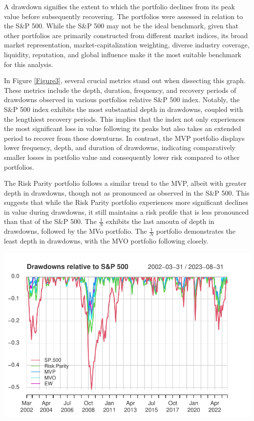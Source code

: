 \documentclass[12pt,preprint, authoryear]{elsarticle}
\let\origfigure\figure
\let\endorigfigure\endfigure
\renewenvironment{figure}[1][2] {
    \expandafter\origfigure\expandafter[H]
} {
    \endorigfigure
}
\numberwithin{equation}{section}
\numberwithin{figure}{section}
\numberwithin{table}{section}
\begin{document}
A drawdown signifies the extent to which the portfolio declines from its
peak value before subsequently recovering. The portfolios were assessed
in relation to the S\&P 500. While the S\&P 500 may not be the ideal
benchmark, given that other portfolios are primarily constructed from
different market indices, its broad market representation,
market-capitalization weighting, diverse industry coverage, liquidity,
reputation, and global influence make it the most suitable benchmark for
this analysis.

In Figure \ref{Figure3}, several crucial metrics stand out when
dissecting this graph. These metrics include the depth, duration,
frequency, and recovery periods of drawdowns observed in various
portfolios relative S\&P 500 index. Notably, the S\&P 500 index exhibits
the most substantial depth in drawdowns, coupled with the lengthiest
recovery periods. This implies that the index not only experiences the
most significant loss in value following its peaks but also takes an
extended period to recover from these downturns. In contrast, the MVP
portfolio displays lower frequency, depth, and duration of drawdowns,
indicating comparatively smaller losses in portfolio value and
consequently lower risk compared to other portfolios.

The Risk Parity portfolio follows a similar trend to the MVP, albeit
with greater depth in drawdowns, though not as pronounced as observed in
the S\&P 500. This suggests that while the Risk Parity portfolio
experiences more significant declines in value during drawdowns, it
still maintains a risk profile that is less pronounced than that of the
S\&P 500. The \(\frac{1}{N}\) exhibits the last amoutn of depth in
drawdowns, followed by the MVo portfolio. The \(\frac{1}{N}\) portfolio
demonstrates the least depth in drawdowns, with the MVO portfolio
following closely.

\begin{figure}[H]

{\centering \includegraphics{Finmetrics_Project_files/figure-latex/Figure3-1} 

}

\caption{Drawdowns \label{Figure3}}\label{fig:Figure3}
\end{figure}
\end{document}
